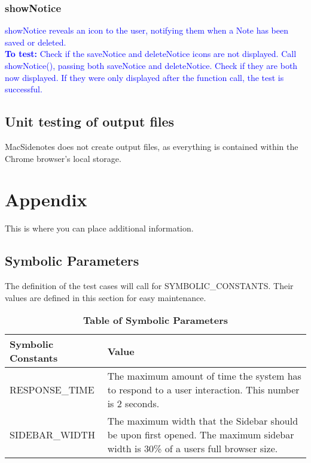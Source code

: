 \documentclass[12pt, titlepage]{article}
\begin{document}
\subsubsection{showNotice}
\textcolor{blue}{showNotice reveals an icon to the user, notifying them when a 
Note has been saved or deleted.\\
	\textbf{To test:} Check if the saveNotice and deleteNotice icons are not 
	displayed. Call showNotice(), passing both saveNotice and deleteNotice. 
	Check if they are both now displayed. If they were only displayed after the 
	function call, the test is successful.}
\subsection{Unit testing of output files}		

MacSidenotes does not create output files, as everything is contained within 
the Chrome browser's local storage.





\newpage

\section{Appendix}

This is where you can place additional information.

\subsection{Symbolic Parameters}

The definition of the test cases will call for SYMBOLIC\_CONSTANTS.
Their values are defined in this section for easy maintenance.

\begin{table}[!htbp]
	\caption{\textbf{Table of Symbolic Parameters}} \label{Table}
	
	\begin{tabularx}{\textwidth}{p{5cm}X}
		\toprule
		\textbf{Symbolic Constants} & \textbf{Value}\\
		\midrule
		RESPONSE\_TIME & The maximum amount of time the system has to respond to a 
		user interaction. This number is 2 seconds.  \\
		SIDEBAR\_WIDTH & The maximum width that the Sidebar should be upon first 
		opened. The maximum sidebar width is 30\% of a users full browser size.\\
		\bottomrule
	\end{tabularx}
	
\end{table}	
\end{document}

